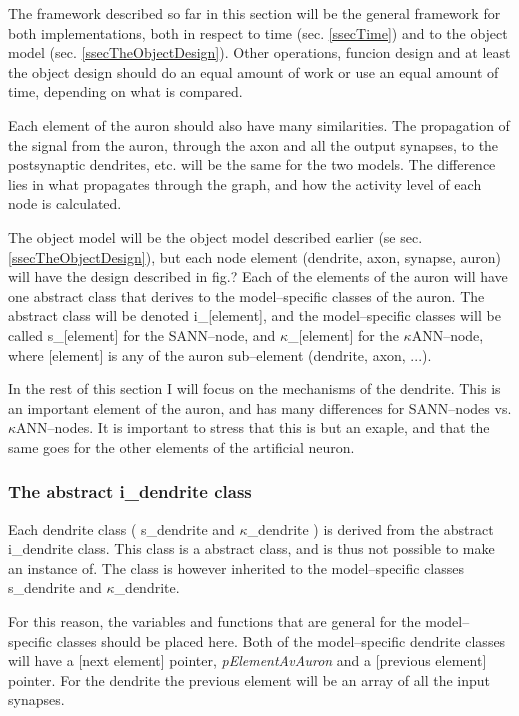 	The framework described so far in this section will be the general framework for both implementations, both in respect to time (sec. \ref{ssecTime}) and to the object model (sec. \ref{ssecTheObjectDesign}).
	Other operations, funcion design and at least the object design should do an equal amount of work or use an equal amount of time, depending on what is compared. %

	Each element of the auron should also have many similarities. The propagation of the signal from the auron, through the axon and all the output synapses, to the postsynaptic dendrites, etc. will be the same for the two models.
	The difference lies in what propagates through the graph, and how the activity level of each node is calculated. 
	
	The object model will be the object model described earlier (se sec. \ref{ssecTheObjectDesign}), but each node element (dendrite, axon, synapse, auron) will have the design %
		described in fig.? %
	Each of the elements of the auron will have one abstract class that derives to the model--specific classes of the auron. 
	The abstract class will be denoted i\_[element], and the model--specific classes will be called s\_[element] for the SANN--node, and $\kappa$\_[element] for the $\kappa$ANN--node, 
		where [element] is any of the auron sub--element (dendrite, axon, ...).

	In the rest of this section I will focus on the mechanisms of the dendrite. This is an important element of the auron, and has many differences for SANN--nodes vs. $\kappa$ANN--nodes. 
	It is important to stress that this is but an exaple, and that the %
		same goes for the other elements of the artificial neuron.

	\subsubsection{The abstract i\_dendrite class}
	Each dendrite class ( s\_dendrite and $\kappa$\_dendrite ) is derived from the abstract i\_dendrite class.
	This class is a abstract class, and is thus not possible to make an instance of. The class is however inherited to the model--specific classes s\_dendrite and $\kappa$\_dendrite.

	For this reason, the variables and functions that are general for the model--specific classes should be placed here. 
	Both of the model--specific dendrite classes will have a [next element] pointer, \emph{pElementAvAuron} and a [previous element] pointer. For the dendrite the previous element will be an array of all the input synapses.

